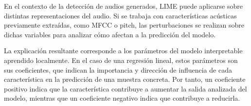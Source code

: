 En el contexto de la detección de audios generados, LIME puede aplicarse sobre distintas representaciones del audio. Si se trabaja con características acústicas previamente extraídas, como MFCC o pitch, las perturbaciones se realizan sobre dichas variables para analizar cómo afectan a la predicción del modelo.

La explicación resultante corresponde a los parámetros del modelo interpretable aprendido localmente. En el caso de una regresión lineal, estos parámetros son sus coeficientes, que indican la importancia y dirección de influencia de cada característica en la predicción de una muestra concreta. Por tanto, un coeficiente positivo indica que la característica contribuye a aumentar la salida analizada del modelo, mientras que un coeficiente negativo indica que contribuye a reducirla.
